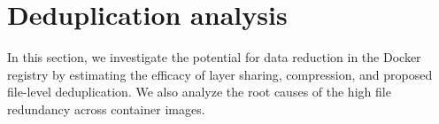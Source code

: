 \section{Deduplication analysis}
\label{sec:redundant_files}

In this section, we investigate the potential for data reduction in the
Docker registry by estimating the efficacy of layer sharing,
compression, and proposed file-level deduplication. 
%
We also analyze the root causes of the high file redundancy
across container images.
%
%
%
%
%
%
%
%




